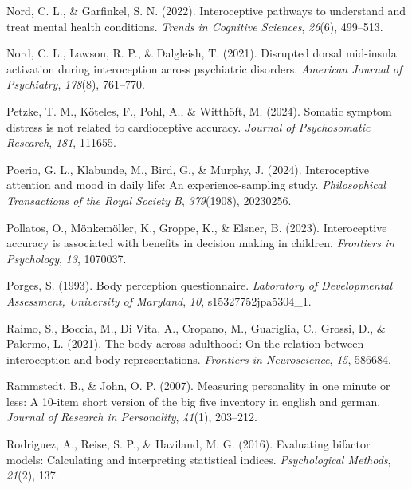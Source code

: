 \documentclass[
  jou,
  floatsintext,
  longtable,
  nolmodern,
  notxfonts,
  notimes,
  colorlinks=true,linkcolor=blue,citecolor=blue,urlcolor=blue]{apa7}
\newlength{\cslhangindent}
\newenvironment{CSLReferences}[2] %
 {\begin{list}{}{%
  \setlength{\itemindent}{0pt}
  \setlength{\leftmargin}{0pt}
  \setlength{\parsep}{0pt}
  \ifodd #1
   \setlength{\leftmargin}{\cslhangindent}
   \setlength{\itemindent}{-1\cslhangindent}
  \fi
  \setlength{\itemsep}{#2\baselineskip}}}
 {\end{list}}
\begin{document}
\begin{CSLReferences}{1}{0}
Nord, C. L., \& Garfinkel, S. N. (2022). Interoceptive pathways to
understand and treat mental health conditions. \emph{Trends in Cognitive
Sciences}, \emph{26}(6), 499--513.

Nord, C. L., Lawson, R. P., \& Dalgleish, T. (2021). Disrupted dorsal
mid-insula activation during interoception across psychiatric disorders.
\emph{American Journal of Psychiatry}, \emph{178}(8), 761--770.

Petzke, T. M., Köteles, F., Pohl, A., \& Witthöft, M. (2024). Somatic
symptom distress is not related to cardioceptive accuracy. \emph{Journal
of Psychosomatic Research}, \emph{181}, 111655.

Poerio, G. L., Klabunde, M., Bird, G., \& Murphy, J. (2024).
Interoceptive attention and mood in daily life: An experience-sampling
study. \emph{Philosophical Transactions of the Royal Society B},
\emph{379}(1908), 20230256.

Pollatos, O., Mönkemöller, K., Groppe, K., \& Elsner, B. (2023).
Interoceptive accuracy is associated with benefits in decision making in
children. \emph{Frontiers in Psychology}, \emph{13}, 1070037.

Porges, S. (1993). Body perception questionnaire. \emph{Laboratory of
Developmental Assessment, University of Maryland}, \emph{10},
s15327752jpa5304\_1.

Raimo, S., Boccia, M., Di Vita, A., Cropano, M., Guariglia, C., Grossi,
D., \& Palermo, L. (2021). The body across adulthood: On the relation
between interoception and body representations. \emph{Frontiers in
Neuroscience}, \emph{15}, 586684.

Rammstedt, B., \& John, O. P. (2007). Measuring personality in one
minute or less: A 10-item short version of the big five inventory in
english and german. \emph{Journal of Research in Personality},
\emph{41}(1), 203--212.

Rodriguez, A., Reise, S. P., \& Haviland, M. G. (2016). Evaluating
bifactor models: Calculating and interpreting statistical indices.
\emph{Psychological Methods}, \emph{21}(2), 137.


\end{CSLReferences}
\end{document}
